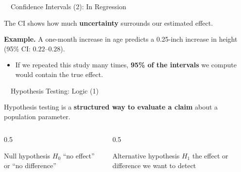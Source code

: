 \documentclass[aspectratio=169,11pt]{beamer}
\begin{document}
\begin{frame}{\ \ Confidence Intervals (2): In Regression}
  \begin{keybox}
    The CI shows how much \textbf{uncertainty} surrounds our estimated effect.
  \end{keybox}
  \vspace{0.6em}
  \textbf{\color{qrnavy}Example.} A one-month increase in age predicts a
  0.25-inch increase in height \quad(95\% CI: $0.22$--$0.28$).
  \vspace{0.6em}
  \begin{itemize}
    \item If we repeated this study many times, \textbf{95\% of the intervals}
          we compute would contain the true effect.
  \end{itemize}
\end{frame}

\begin{frame}{\ \ Hypothesis Testing: Logic (1)}
  \begin{keybox}
    Hypothesis testing is a \textbf{structured way to evaluate a claim} about a
    population parameter.
  \end{keybox}
  \vspace{0.8em}
  \begin{columns}[T]
    \begin{column}{0.5\textwidth}
      \begin{block}{Null hypothesis $H_0$}
        ``no effect'' or ``no difference''
      \end{block}
    \end{column}
    \begin{column}{0.5\textwidth}
      \begin{block}{Alternative hypothesis $H_1$}
        the effect or difference we want to detect
      \end{block}
    \end{column}
  \end{columns}
\end{frame}
\end{document}

